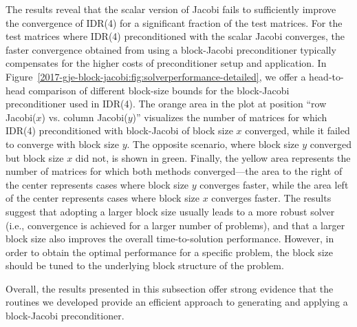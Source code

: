 The results reveal that the scalar version of Jacobi fails to sufficiently
improve the convergence of IDR(4) for a significant fraction of the test
matrices.
For the test matrices where IDR(4) preconditioned with the scalar Jacobi
converges, the faster convergence obtained from using a block-Jacobi
preconditioner typically compensates for the higher costs of preconditioner
setup and application.
In Figure~\ref{2017-gje-block-jacobi:fig:solverperformance-detailed}, we offer a
head-to-head comparison of different block-size bounds for the
block-Jacobi preconditioner used in IDR(4).
The orange area in the plot at position ``row Jacobi($x$) vs. column 
Jacobi($y$)'' 
visualizes the number of matrices for which IDR(4) preconditioned with 
block-Jacobi of block size $x$ converged, while it failed to converge with block size $y$. 
The opposite scenario, where block size $y$ converged
but block size $x$ did not, is shown in green. Finally, the yellow area 
represents the
number of matrices for which both methods converged---the area to the right of 
the center represents cases where block size $y$ converges faster, while the
area left of the center represents cases where block size $x$ converges faster. 
The results suggest that adopting a larger block size usually leads to a more robust solver
(i.e., convergence is achieved for a larger number of problems), and that a
larger block size also improves the overall time-to-solution performance.
However, in order to obtain the optimal performance for a specific problem, the
block size should be tuned to the underlying block structure of the problem.

Overall, the results presented in this subsection offer strong evidence that the
routines we developed
provide an efficient approach to generating and applying a block-Jacobi
preconditioner.

